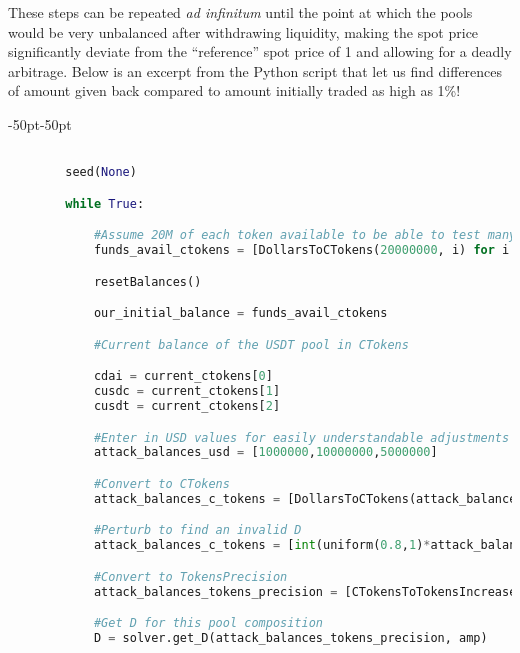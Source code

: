 \documentclass{article}
\begin{document}
{{{{    These steps can be repeated \textit{ad infinitum} until the point at which the pools would be very unbalanced after withdrawing liquidity, making the spot price significantly deviate from the ``reference'' spot price of 1 and allowing for a deadly arbitrage. Below is an excerpt from the Python script that let us find differences of amount given back compared to amount initially traded as high as 1\%! \vspace{5mm}

    \begin{adjustwidth}{-50pt}{-50pt}
        \begin{lstlisting}[language=Python]

        seed(None)

        while True: 

            #Assume 20M of each token available to be able to test many configurations 
            funds_avail_ctokens = [DollarsToCTokens(20000000, i) for i in range(N_COINS)]

            resetBalances()

            our_initial_balance = funds_avail_ctokens

            #Current balance of the USDT pool in CTokens

            cdai = current_ctokens[0]
            cusdc = current_ctokens[1]
            cusdt = current_ctokens[2]

            #Enter in USD values for easily understandable adjustments
            attack_balances_usd = [1000000,10000000,5000000]

            #Convert to CTokens
            attack_balances_c_tokens = [DollarsToCTokens(attack_balances_usd[0], 0), DollarsToCTokens(attack_balances_usd[1], 1), DollarsToCTokens(attack_balances_usd[2], 2)]

            #Perturb to find an invalid D
            attack_balances_c_tokens = [int(uniform(0.8,1)*attack_balances_c_tokens[0]), int(uniform(0.8,1)*attack_balances_c_tokens[1]), int(uniform(0.8,1)*attack_balances_c_tokens[2])]

            #Convert to TokensPrecision
            attack_balances_tokens_precision = [CTokensToTokensIncreasedPrecision(attack_balances_c_tokens[0], 0), CTokensToTokensIncreasedPrecision(attack_balances_c_tokens[1], 1), CTokensToTokensIncreasedPrecision(attack_balances_c_tokens[2], 2)]

            #Get D for this pool composition
            D = solver.get_D(attack_balances_tokens_precision, amp)
            

\end{lstlisting}
\end{adjustwidth}}}}}
\end{document}
